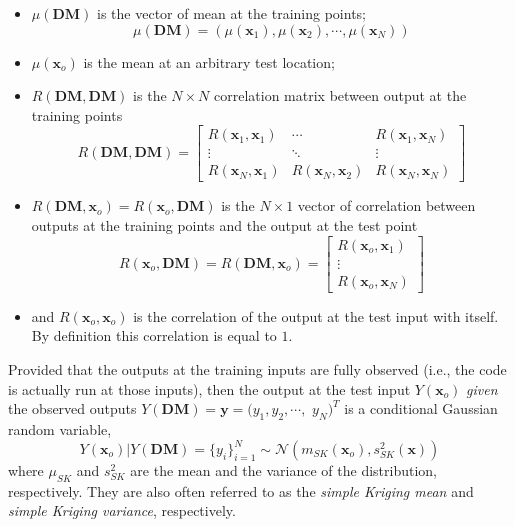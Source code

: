 \begin{itemize}
	\item $\mu(\mathbf{DM})$ is the vector of mean at the training points;
		\begin{equation}
			\mu(\mathbf{DM}) = (\mu(\mathbf{x}_1), \mu(\mathbf{x}_2), \cdots, \mu(\mathbf{x}_N)) 
		\label{eq:training_mean_vector}
		\end{equation}
	\item $\mu(\mathbf{x}_o)$ is the mean at an arbitrary test location;
	\item $R(\mathbf{DM}, \mathbf{DM})$ is the $N \times N$ correlation matrix between output at the training points
		\begin{equation}
			R(\mathbf{DM}, \mathbf{DM}) = 
				\begin{bmatrix}
					R(\mathbf{x}_1, \mathbf{x}_1) & \cdots												& R(\mathbf{x}_1, \mathbf{x}_N) \\
					\vdots												& \ddots												&	\vdots \\
					R(\mathbf{x}_N, \mathbf{x}_1)	&	R(\mathbf{x}_N, \mathbf{x}_2) & R(\mathbf{x}_N, \mathbf{x}_N)
				\end{bmatrix}
		\label{eq:training_correlation_matrix}
		\end{equation}
	\item $R(\mathbf{DM}, \mathbf{x}_o) = R(\mathbf{x}_o, \mathbf{DM})$ is the $N \times 1$ vector of correlation between outputs at the training points and the output at the test point
			\begin{equation}
				R(\mathbf{x}_o, \mathbf{DM}) = R(\mathbf{DM}, \mathbf{x}_o) =  
					\begin{bmatrix}
						R(\mathbf{x}_o, \mathbf{x}_1) \\
						\vdots												\\
						R(\mathbf{x}_o, \mathbf{x}_N)	
					\end{bmatrix}
			\label{eq:training_test_correlation}
			\end{equation}
		\item and $R(\mathbf{x}_o, \mathbf{x}_o)$ is the correlation of the output at the test input with itself. By definition this correlation is equal to $1$.
\end{itemize}

Provided that the outputs at the training inputs are fully observed (i.e., the code is actually run at those inputs),
then the output at the test input $Y(\mathbf{x}_o)$ \emph{given	} the observed outputs $Y(\mathbf{DM}) = \mathbf{y} = (y_1, y_2, \cdots,$ 
$y_N)^T$ is a conditional Gaussian random variable,
\begin{equation}
	Y(\mathbf{x}_o) | Y(\mathbf{DM}) = \{y_i\}_{i=1}^N \sim \mathcal{N} \left( m_{SK}(\mathbf{x}_o), s^2_{SK}(\mathbf{x})\right)
\label{eq:joint_training_test}
\end{equation}
where $\mu_{SK}$ and $s^2_{SK}$ are the mean and the variance of the distribution, respectively.
They are also often referred to as the \emph{simple Kriging mean} and \emph{simple Kriging variance}, respectively.

